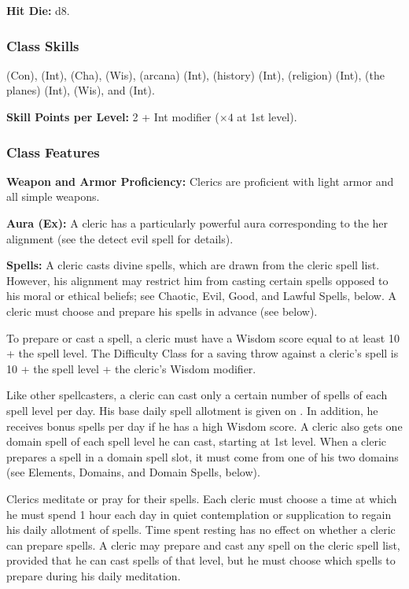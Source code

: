\textbf{Hit Die:} d8.

\subsubsection{Class Skills}
 (Con),  (Int),  (Cha),  (Wis),  (arcana) (Int),  (history) (Int),  (religion) (Int),  (the planes) (Int),  (Wis), and  (Int).

\textbf{Skill Points per Level:} 2 + Int modifier ($\times4$ at 1st level).

\subsubsection{Class Features}
\textbf{Weapon and Armor Proficiency:} Clerics are proficient with light armor and all simple weapons.

\textbf{Aura (Ex):} A cleric has a particularly powerful aura corresponding to the her alignment (see the detect evil spell for details).

\textbf{Spells:} A cleric casts divine spells, which are drawn from the cleric spell list. However, his alignment may restrict him from casting certain spells opposed to his moral or ethical beliefs; see Chaotic, Evil, Good, and Lawful Spells, below. A cleric must choose and prepare his spells in advance (see below).

To prepare or cast a spell, a cleric must have a Wisdom score equal to at least 10 + the spell level. The Difficulty Class for a saving throw against a cleric's spell is 10 + the spell level + the cleric's Wisdom modifier.

Like other spellcasters, a cleric can cast only a certain number of spells of each spell level per day. His base daily spell allotment is given on . In addition, he receives bonus spells per day if he has a high Wisdom score. A cleric also gets one domain spell of each spell level he can cast, starting at 1st level. When a cleric prepares a spell in a domain spell slot, it must come from one of his two domains (see Elements, Domains, and Domain Spells, below).

Clerics meditate or pray for their spells. Each cleric must choose a time at which he must spend 1 hour each day in quiet contemplation or supplication to regain his daily allotment of spells. Time spent resting has no effect on whether a cleric can prepare spells. A cleric may prepare and cast any spell on the cleric spell list, provided that he can cast spells of that level, but he must choose which spells to prepare during his daily meditation.

